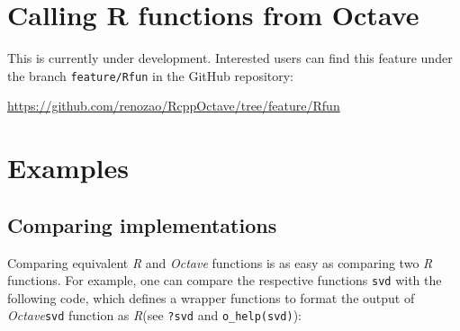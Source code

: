 \documentclass[english,10pt,a4paper]{article}\usepackage[]{graphicx}\usepackage[]{color}
\let\proglang=\textit
\let\code=\texttt
\newcommand{\R}{\proglang{R}\xspace}
\newcommand{\octave}{\proglang{Octave}\xspace}
\begin{document}
\section{Calling R functions from Octave}

This is currently under development.
Interested users can find this feature under the branch \code{feature/Rfun} in
the GitHub repository:

\url{https://github.com/renozao/RcppOctave/tree/feature/Rfun}

\section{Examples}
\subsection{Comparing implementations}

Comparing equivalent \R and \octave functions is as easy as comparing two \R
functions.
For example, one can compare the respective functions \code{svd} with the
following code, which defines a wrapper functions to format the output of
\octave \code{svd} function as \R (see \code{?svd} and \code{o\_help(svd)}):
\end{document}
